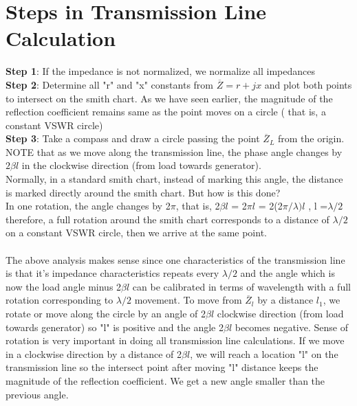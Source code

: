 \section{Steps in Transmission Line Calculation}
\textbf{Step 1}: If the impedance is not normalized, we normalize all impedances\\
\textbf{Step 2}: Determine all "r" and "x" constants from $\overline{Z} = r + jx$ and plot both points to intersect on the smith chart.
As we have seen earlier, the magnitude of the reflection coefficient remains same as the point moves on a circle (
that is, a constant VSWR circle)\\
\textbf{Step 3}: Take a compass and draw a circle passing the point $\overline{Z}_L$ from the origin.\\
NOTE that as we move along the transmission line, the phase angle changes by $2\beta{l}$ in the clockwise direction (from load towards generator).\\
Normally, in a standard smith chart, instead of marking this angle, the distance is marked directly around the smith chart. But how is this done?\\
In one rotation, the angle changes by 2$\pi$, that is, 2$\beta{l}$ = 2$\pi{l}$ = 2(2$\pi/\lambda){l}$ , l =$\lambda/2$ therefore, a full rotation around the smith chart corresponds to a distance of $\lambda/2$ on a constant VSWR circle, then we arrive at the same point.\\\\
The above analysis makes sense since one characteristics of the transmission line is that it's impedance characteristics repeats every $\lambda/2$ and the angle which is now the load angle minus 2$\beta{l}$ can be calibrated in terms of wavelength with a full rotation corresponding to $\lambda/2$ movement. To move from $\overline{Z}_{l}$ by a distance $l_1$, we rotate or move along the circle by an angle of 2$\beta{l}$ clockwise direction (from load towards generator) so "l" is positive and the angle 2$\beta{l}$ becomes negative. Sense of rotation is very important in doing  all transmission line calculations. If we move in a clockwise direction by a distance of 2$\beta{l}$, we will reach a location "l" on the transmission line so the intersect point after moving "l" distance keeps the magnitude of the reflection coefficient. We get a new angle smaller than the previous angle.\\

